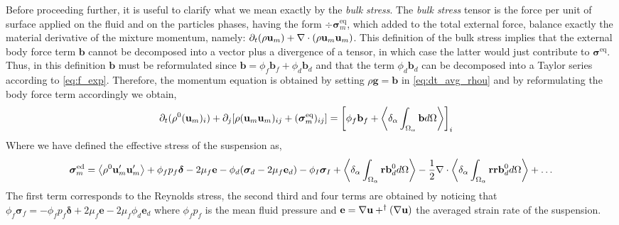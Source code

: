 Before proceeding further, it is useful to clarify what we mean exactly by the \textit{bulk stress}.
The \textit{bulk stress} tensor is the force per unit of surface applied on the fluid and on the particles phases, having the form $\div \bm{\sigma}^\text{eq}_m$, which added to the total external force, balance exactly the material derivative of the mixture momentum, namely: $\partial_t (\rho \textbf{u}_m) + \mathbf{\nabla}\cdot (\rho \textbf{u}_m\textbf{u}_m)$. 
This definition of the bulk stress implies that the external body force term $\textbf{b}$ cannot be decomposed into a vector plus a divergence of a tensor, in which case the latter would just contribute to $\bm{\sigma}^\text{eq}$.
Thus, in this definition $\textbf{b}$ must be reformulated since $\textbf{b} = \phi_f \textbf{b}_f+\phi_d \textbf{b}_d$ and that the term $\phi_d \textbf{b}_d$ can be decomposed into a Taylor series according to \ref{eq:f_exp}. 
Therefore, the momentum equation is obtained by setting $\rho \textbf{g} = \textbf{b}$ in \ref{eq:dt_avg_rhou} and by reformulating the body force term accordingly we obtain,
\begin{align}
    \label{eq:momentum_bulk}
    \partial_t (\rho^0 (\textbf{u}_m)_i)
    + \partial_j  [\rho (\textbf{u}_m \textbf{u}_m)_{ij}
    + (\bm\sigma_{m}^\text{eq})_{ij}]
    &= \left[\phi_f \textbf{b}_f + \left<\delta_\alpha \int_{\Omega_{\alpha}} \textbf{b} d\Omega\right>\right]_i
\end{align}
Where we have defined the effective stress of the suspension as,
\begin{equation}
    \bm{\sigma}_m^\text{ed}
    = 
    \left<\rho^0\textbf{u}_m'\textbf{u}'_m\right>
    + \phi_fp_f\bm\delta
    - 2\mu_f\textbf{e}
    - \phi_d(\bm{\sigma}_d - 2\mu_f \textbf{e}_d)
    - \phi_I \bm{\sigma}_I
    + \left<\delta_\alpha \int_{\Omega_{\alpha}} \textbf{r}\textbf{b}_d^0 d\Omega\right>
    -\frac{1}{2} \mathbf{\nabla}\cdot \left<\delta_\alpha \int_{\Omega_{\alpha}} \textbf{rr}\textbf{b}_d^0 d\Omega\right> + \ldots
    \label{eq:sigma_bulk}
\end{equation}
The first term corresponds to the Reynolds stress, the second third and four terms are obtained by noticing that 
$
    \phi_f \bm\sigma_f
    = -\phi_f p_f \bm\delta
    + 2\mu_f \textbf{e}
    - 2 \mu_f \phi_d \textbf{e}_d 
$
where $\phi_f p_f$ is the mean fluid pressure and $\textbf{e} = \mathbf{\nabla} \textbf{u} + ^\dagger(\mathbf{\nabla} \textbf{u})$ the averaged strain rate of the suspension. 
